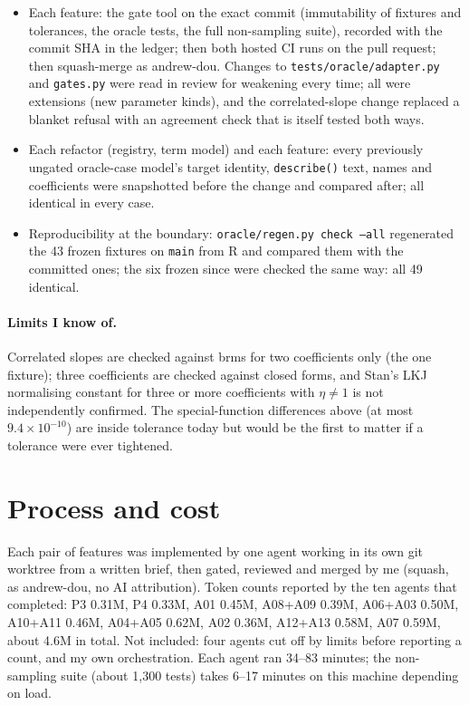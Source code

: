\documentclass[11pt]{article}
\newcommand{\code}[1]{\texttt{#1}}
\newcommand{\file}[1]{\texttt{#1}}
\begin{document}
\begin{itemize}
\item Each feature: the gate tool on the exact commit (immutability of fixtures and tolerances, the oracle tests, the
  full non-sampling suite), recorded with the commit SHA in the ledger; then both hosted CI runs on the pull request;
  then squash-merge as andrew-dou. Changes to \file{tests/oracle/adapter.py} and \file{gates.py} were read in review
  for weakening every time; all were extensions (new parameter kinds), and the correlated-slope change replaced a
  blanket refusal with an agreement check that is itself tested both ways.
\item Each refactor (registry, term model) and each feature: every previously ungated oracle-case model's target
  identity, \code{describe()} text, names and coefficients were snapshotted before the change and compared after; all
  identical in every case.
\item Reproducibility at the boundary: \code{oracle/regen.py check --all} regenerated the 43 frozen fixtures on \code{main} from R
  and compared them with the committed ones; the six frozen since were checked the same way: all 49 identical.
\end{itemize}

\paragraph{Limits I know of.} Correlated slopes are checked against brms for two coefficients only (the one fixture);
three coefficients are checked against closed forms, and Stan's LKJ normalising constant for three or more
coefficients with $\eta \ne 1$ is not independently confirmed. The special-function differences above (at most $9.4\times10^{-10}$) are inside
tolerance today but would be the first to matter if a tolerance were ever tightened.

\section{Process and cost}
\label{sec:cost}

Each pair of features was implemented by one agent working in its own git worktree from a written brief, then
gated, reviewed and merged by me (squash, as andrew-dou, no AI attribution). Token counts reported by the ten agents
that completed: P3 0.31M, P4 0.33M, A01 0.45M, A08+A09 0.39M, A06+A03 0.50M, A10+A11 0.46M, A04+A05 0.62M, A02 0.36M,
A12+A13 0.58M, A07 0.59M, about 4.6M in total. Not included: four agents cut off by limits before reporting a count,
and my own orchestration. Each agent ran 34--83 minutes; the non-sampling suite (about 1{,}300 tests) takes 6--17
minutes on this machine depending on load.
\end{document}
